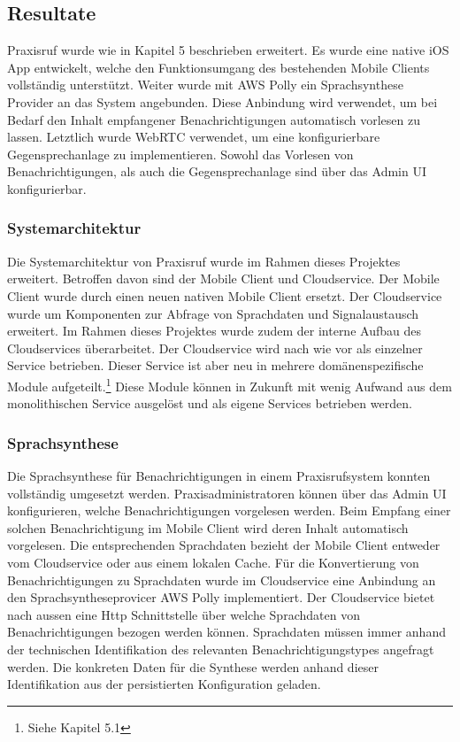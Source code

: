 \subsection{Resultate}

Praxisruf wurde wie in Kapitel 5 beschrieben erweitert.
Es wurde eine native iOS App entwickelt, welche den Funktionsumgang des bestehenden Mobile Clients vollständig unterstützt.
Weiter wurde mit AWS Polly ein Sprachsynthese Provider an das System angebunden.
Diese Anbindung wird verwendet, um bei Bedarf den Inhalt empfangener Benachrichtigungen automatisch vorlesen zu lassen.
Letztlich wurde WebRTC verwendet, um eine konfigurierbare Gegensprechanlage zu implementieren.
Sowohl das Vorlesen von Benachrichtigungen, als auch die Gegensprechanlage sind über das Admin UI konfigurierbar.

\subsubsection{Systemarchitektur}

Die Systemarchitektur von Praxisruf wurde im Rahmen dieses Projektes erweitert.
Betroffen davon sind der Mobile Client und Cloudservice.
Der Mobile Client wurde durch einen neuen nativen Mobile Client ersetzt.
Der Cloudservice wurde um Komponenten zur Abfrage von Sprachdaten und Signalaustausch erweitert.
Im Rahmen dieses Projektes wurde zudem der interne Aufbau des Cloudservices überarbeitet.
Der Cloudservice wird nach wie vor als einzelner Service betrieben.
Dieser Service ist aber neu in mehrere domänenspezifische Module aufgeteilt.\footnote{Siehe Kapitel 5.1}
Diese Module können in Zukunft mit wenig Aufwand aus dem monolithischen Service ausgelöst und als eigene Services betrieben werden.

\subsubsection{Sprachsynthese}

Die Sprachsynthese für Benachrichtigungen in einem Praxisrufsystem konnten vollständig umgesetzt werden.
Praxisadministratoren können über das Admin UI konfigurieren, welche Benachrichtigungen vorgelesen werden.
Beim Empfang einer solchen Benachrichtigung im Mobile Client wird deren Inhalt automatisch vorgelesen.
Die entsprechenden Sprachdaten bezieht der Mobile Client entweder vom Cloudservice oder aus einem lokalen Cache.
Für die Konvertierung von Benachrichtigungen zu Sprachdaten wurde im Cloudservice eine Anbindung an den Sprachsyntheseprovicer AWS Polly implementiert.
Der Cloudservice bietet nach aussen eine Http Schnittstelle über welche Sprachdaten von Benachrichtigungen bezogen werden können.
Sprachdaten müssen immer anhand der technischen Identifikation des relevanten Benachrichtigungstypes angefragt werden.
Die konkreten Daten für die Synthese werden anhand dieser Identifikation aus der persistierten Konfiguration geladen.


